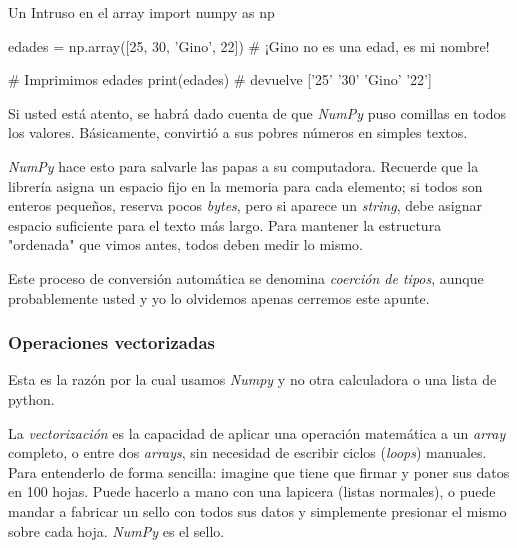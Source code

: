 \begin{pycode}{Un Intruso en el array}
    import numpy as np

    edades = np.array([25, 30, 'Gino', 22]) # ¡Gino no es una edad, es mi nombre!

    # Imprimimos edades
    print(edades) # devuelve ['25' '30' 'Gino' '22']
\end{pycode}
Si usted está atento, se habrá dado cuenta de que \textit{NumPy} puso comillas en todos los valores. Básicamente, convirtió a sus pobres números en simples textos.

\textit{NumPy} hace esto para salvarle las papas a su computadora. Recuerde que la librería asigna un espacio fijo en la memoria para cada elemento; si todos son enteros pequeños, reserva pocos \textit{bytes}, pero si aparece un \textit{string}, debe asignar espacio suficiente para el texto más largo. Para mantener la estructura "ordenada" que vimos antes, todos deben medir lo mismo.

Este proceso de conversión automática se denomina \textit{coerción de tipos}, aunque probablemente usted y yo lo olvidemos apenas cerremos este apunte.


\subsubsection{Operaciones vectorizadas}

Esta es la razón por la cual usamos \textit{Numpy} y no otra calculadora o una lista de python.

La \textit{vectorización} es la capacidad de aplicar una operación matemática a un \textit{array} completo, o entre dos \textit{arrays}, sin necesidad de escribir ciclos (\textit{loops}) manuales. Para entenderlo de forma sencilla: imagine que tiene que firmar y poner sus datos en 100 hojas. Puede hacerlo a mano con una lapicera (listas normales), o puede mandar a fabricar un sello con todos sus datos y simplemente presionar el mismo sobre cada hoja. \textit{NumPy} es el sello.

